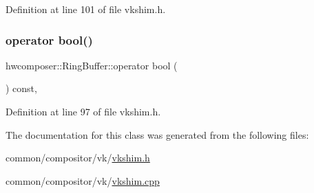 Definition at line 101 of file vkshim.\+h.


\begin{DoxyCode}{0}
\end{DoxyCode}
\mbox{\label{classhwcomposer_1_1RingBuffer_a1273d3e06df05cddc6e306472d2cb717}} 
\subsubsection{\texorpdfstring{operator bool()}{operator bool()}}
{\footnotesize\ttfamily hwcomposer\+::\+Ring\+Buffer\+::operator bool (\begin{DoxyParamCaption}{ }\end{DoxyParamCaption}) const\hspace{0.3cm}{\ttfamily [inline]}, {\ttfamily [explicit]}}



Definition at line 97 of file vkshim.\+h.


\begin{DoxyCode}{0}
\end{DoxyCode}


The documentation for this class was generated from the following files\+:\begin{DoxyCompactItemize}
\item 
common/compositor/vk/\mbox{\hyperlink{vkshim_8h}{vkshim.\+h}}\item 
common/compositor/vk/\mbox{\hyperlink{vkshim_8cpp}{vkshim.\+cpp}}\end{DoxyCompactItemize}
